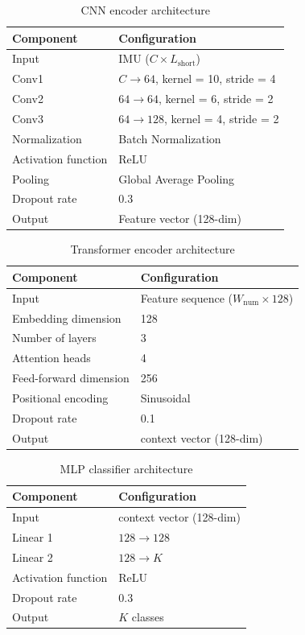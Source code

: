 \documentclass[submit]{ipsj}
\begin{document}
{\begin{table}[t]
\centering
\caption{CNN encoder architecture}
\begin{tabular}{l|l}
\hline
Component & Configuration \\
\hline
Input & IMU ($C \times L_{\text{short}}$) \\
Conv1 & $C \rightarrow 64$, kernel = 10, stride = 4 \\
Conv2 & $64 \rightarrow 64$, kernel = 6, stride = 2 \\
Conv3 & $64 \rightarrow 128$, kernel = 4, stride = 2 \\
Normalization & Batch Normalization \\
Activation function & ReLU \\
Pooling & Global Average Pooling \\
Dropout rate & 0.3 \\
Output & Feature vector (128-dim) \\
\hline
\end{tabular}
\label{tab:cnn_arch}
\end{table}


\begin{table}[t]
\centering
\caption{Transformer encoder architecture}
\begin{tabular}{l|l}
\hline
Component & Configuration \\
\hline
Input & Feature sequence ($W_{\mathrm{num}} \times 128$) \\
Embedding dimension & 128 \\
Number of layers & 3 \\
Attention heads & 4 \\
Feed-forward dimension & 256 \\
Positional encoding & Sinusoidal \\
Dropout rate & 0.1 \\
Output & context vector (128-dim) \\
\hline
\end{tabular}
\label{tab:transformer_arch}
\end{table}


\begin{table}[t]
\centering
\caption{MLP classifier architecture}
\begin{tabular}{l|l}
\hline
Component & Configuration \\
\hline
Input & context vector (128-dim) \\
Linear 1 & $128 \rightarrow 128$ \\
Linear 2 & $128 \rightarrow K$ \\
Activation function & ReLU \\
Dropout rate & 0.3 \\
Output & $K$ classes \\
\hline
\end{tabular}
\label{tab:mlp_arch}
\end{table}



}
\end{document}
